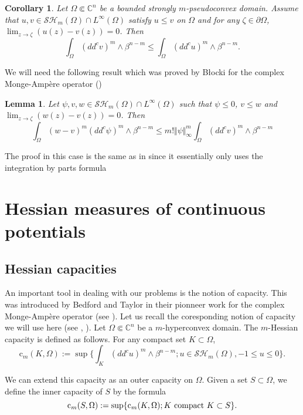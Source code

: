 \documentclass[12pt]{amsart}
\newtheorem{lemma}[theorem]{Lemma}
\newtheorem{corollary}[theorem]{Corollary}
\theoremstyle{definition}
\numberwithin{theorem}{section}
\numberwithin{equation}{section}
\newcommand{\C}{\mathbb{C}}
\begin{document}
\begin{corollary} \label{coro:Comparison Principle} Let $\Omega \Subset \C^n$ be a bounded strongly $m$-pseudoconvex domain. Assume that  $u,v\in \mathcal{SH}_m(\Omega)\cap L^{\infty}(\Omega)$ satisfy $u \leq v$ on $\Omega$ and for any $\zeta \in \partial \Omega$, $\lim_{z \rightarrow \zeta }(u(z)- v(z))= 0$.
Then
 $$
 \int_{\Omega}(dd^c v)^m\wedge\beta^{n-m} \leq \int_{\Omega}(dd^c u)^m\wedge\beta^{n-m}.
 $$
\end{corollary}
 We will need the following result which was proved by B\l ocki for the complex Monge-Amp\`ere operator (\cite{Bl93})
 \begin{lemma} \label{lem:Blocki} Let $\psi,  v, w \in \mathcal{SH}_m (\Omega) \cap L^{\infty} (\Omega)$ such that $\psi \leq 0$,  $v \leq w$ and 
$ \lim_{z \to \zeta} (w (z) - v(z)) = 0$. Then
$$
\int_\Omega (w-v)^m (dd^c \psi)^m \wedge \beta^{n-m} \leq m! \Vert \psi \Vert_{\infty}^m  \int_\Omega  (dd^c v)^m \wedge \beta^{n-m}
$$ 
 \end{lemma}
The proof in this case is the same as in \cite{Bl93} since it essentially only uses the integration by parts formula



\section{Hessian measures of continuous potentials} 


\subsection{Hessian capacities} 

An important tool in dealing with our problems is the notion of capacity. This was introduced by  Bedford and Taylor in their pionneer  work for the complex Monge-Amp\`ere operator (see \cite{BT82}). 
Let us recall the coresponding notion of capacity we will use here (see \cite{Lu12}, \cite{SA13}). Let $\Omega \Subset \C^n$  be a $m$-hyperconvex domain.  The $m$-Hessian capacity  is defined as follows. For any compact set $K \subset \Omega$,
$$
 \text{c}_m(K,\Omega) := \sup \{\int_K  (dd^c u)^m \wedge \beta^{n - m} ; u \in \mathcal{SH}_m (\Omega) , - 1 \leq u \leq 0\}.
$$

We can extend this capacity as an outer capacity on $\Omega$. Given a  set $S \subset \Omega$, we define the inner capacity of $S$ by the formula
$$
\text{c}_m(S,\Omega) := \sup \{\text{c}_m(K,\Omega) ; K \, \, \hbox{compact} \, \, K \subset S\}.
$$ 
\end{document}
